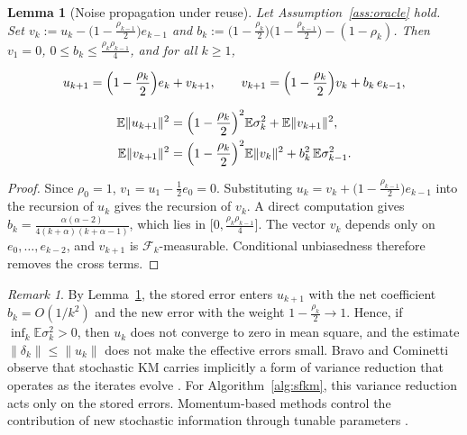 \documentclass[10pt,draft]{article}
\numberwithin{equation}{section}
\newtheorem{lemma}[theorem]{Lemma}
\theoremstyle{definition}
\theoremstyle{remark}
\newtheorem{remark}[theorem]{Remark}
\begin{document}
\begin{lemma}[Noise propagation under reuse]\label{lem:noise} Let Assumption~\ref{ass:oracle} hold. Set $v_k:=u_k-\bigl(1-\frac{\rho_{k-1}}{2}\bigr)e_{k-1}$ and $b_k:=\bigl(1-\frac{\rho_k}{2}\bigr)\bigl(1-\frac{\rho_{k-1}}{2}\bigr)-(1-\rho_k)$. Then $v_1=0$, $0\leq b_k\leq\frac{\rho_k\rho_{k-1}}{4}$, and for all $k\geq1$,

\begin{equation}\label{eq:noise-split}
u_{k+1}=\Bigl(1-\frac{\rho_k}{2}\Bigr)e_k+v_{k+1},\qquad v_{k+1}=\Bigl(1-\frac{\rho_k}{2}\Bigr)v_k+b_k\,e_{k-1},
\end{equation}

\begin{equation}\label{eq:noise-recursion}
\begin{split}
\mathbb{E}\lVert u_{k+1}\rVert^2&=\Bigl(1-\frac{\rho_k}{2}\Bigr)^2\mathbb{E}\sigma_k^2+\mathbb{E}\lVert v_{k+1}\rVert^2,\\
\mathbb{E}\lVert v_{k+1}\rVert^2&=\Bigl(1-\frac{\rho_k}{2}\Bigr)^2\mathbb{E}\lVert v_k\rVert^2+b_k^2\,\mathbb{E}\sigma_{k-1}^2.
\end{split}
\end{equation}

\end{lemma}

\begin{proof} Since $\rho_0=1$, $v_1=u_1-\frac12e_0=0$. Substituting $u_k=v_k+\bigl(1-\frac{\rho_{k-1}}{2}\bigr)e_{k-1}$ into the recursion of $u_k$ gives the recursion of $v_k$. A direct computation gives $b_k=\frac{\alpha(\alpha-2)}{4(k+\alpha)(k+\alpha-1)}$, which lies in $\bigl[0,\frac{\rho_k\rho_{k-1}}{4}\bigr]$. The vector $v_k$ depends only on $e_0,\dots,e_{k-2}$, and $v_{k+1}$ is $\mathcal{F}_k$-measurable. Conditional unbiasedness therefore removes the cross terms. \end{proof}

\begin{remark}\label{rem:reuse-vr} By Lemma~\ref{lem:noise}, the stored error enters $u_{k+1}$ with the net coefficient $b_k=O(1/k^2)$ and the new error with the weight $1-\frac{\rho_k}{2}\to1$. Hence, if $\inf_k\mathbb E\sigma_k^2>0$, then $u_k$ does not converge to zero in mean square, and the estimate $\lVert\delta_k\rVert\leq\lVert u_k\rVert$ does not make the effective errors small. Bravo and Cominetti observe that stochastic KM carries implicitly a form of variance reduction that operates as the iterates evolve \cite[Remark~2.3]{bravo2024stochastic}. For Algorithm~\ref{alg:sfkm}, this variance reduction acts only on the stored errors. Momentum-based methods control the contribution of new stochastic information through tunable parameters \cite{cutkosky2020momentum,gao2024polyak}.
\end{remark}
\end{document}
